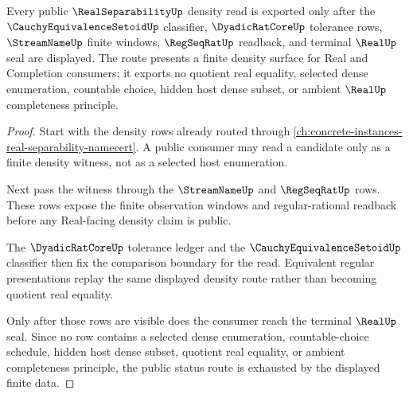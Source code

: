 \begin{theorem}
\label{thm:real-separability-public-status-route}
Every public $\RealSeparabilityUp$ density read is exported only after the $\CauchyEquivalenceSetoidUp$ classifier, $\DyadicRatCoreUp$ tolerance rows, $\StreamNameUp$ finite windows, $\RegSeqRatUp$ readback, and terminal $\RealUp$ seal are displayed. The route presents a finite density surface for Real and Completion consumers; it exports no quotient real equality, selected dense enumeration, countable choice, hidden host dense subset, or ambient $\RealUp$ completeness principle.
\end{theorem}
\begin{proof}
Start with the density rows already routed through \autoref{ch:concrete-instances-real-separability-namecert}. A public consumer may read a candidate only as a finite density witness, not as a selected host enumeration.

Next pass the witness through the $\StreamNameUp$ and $\RegSeqRatUp$ rows. These rows expose the finite observation windows and regular-rational readback before any Real-facing density claim is public.

The $\DyadicRatCoreUp$ tolerance ledger and the $\CauchyEquivalenceSetoidUp$ classifier then fix the comparison boundary for the read. Equivalent regular presentations replay the same displayed density route rather than becoming quotient real equality.

Only after those rows are visible does the consumer reach the terminal $\RealUp$ seal. Since no row contains a selected dense enumeration, countable-choice schedule, hidden host dense subset, quotient real equality, or ambient completeness principle, the public status route is exhausted by the displayed finite data.
\end{proof}
